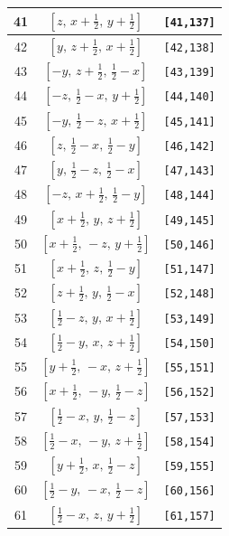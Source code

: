 \documentclass[fleqn,8pt]{jsarticle}
\begin{document}
\begin{longtable}{ccc}
41 & $\left[ z,\, x + \frac{1}{2},\, y + \frac{1}{2} \right]$ & {\tt [41,137]} \\ \hline
42 & $\left[ y,\, z + \frac{1}{2},\, x + \frac{1}{2} \right]$ & {\tt [42,138]} \\ \hline
43 & $\left[ - y,\, z + \frac{1}{2},\, \frac{1}{2} - x \right]$ & {\tt [43,139]} \\ \hline
44 & $\left[ - z,\, \frac{1}{2} - x,\, y + \frac{1}{2} \right]$ & {\tt [44,140]} \\ \hline
45 & $\left[ - y,\, \frac{1}{2} - z,\, x + \frac{1}{2} \right]$ & {\tt [45,141]} \\ \hline
46 & $\left[ z,\, \frac{1}{2} - x,\, \frac{1}{2} - y \right]$ & {\tt [46,142]} \\ \hline
47 & $\left[ y,\, \frac{1}{2} - z,\, \frac{1}{2} - x \right]$ & {\tt [47,143]} \\ \hline
48 & $\left[ - z,\, x + \frac{1}{2},\, \frac{1}{2} - y \right]$ & {\tt [48,144]} \\ \hline
49 & $\left[ x + \frac{1}{2},\, y,\, z + \frac{1}{2} \right]$ & {\tt [49,145]} \\ \hline
50 & $\left[ x + \frac{1}{2},\, - z,\, y + \frac{1}{2} \right]$ & {\tt [50,146]} \\ \hline
51 & $\left[ x + \frac{1}{2},\, z,\, \frac{1}{2} - y \right]$ & {\tt [51,147]} \\ \hline
52 & $\left[ z + \frac{1}{2},\, y,\, \frac{1}{2} - x \right]$ & {\tt [52,148]} \\ \hline
53 & $\left[ \frac{1}{2} - z,\, y,\, x + \frac{1}{2} \right]$ & {\tt [53,149]} \\ \hline
54 & $\left[ \frac{1}{2} - y,\, x,\, z + \frac{1}{2} \right]$ & {\tt [54,150]} \\ \hline
55 & $\left[ y + \frac{1}{2},\, - x,\, z + \frac{1}{2} \right]$ & {\tt [55,151]} \\ \hline
56 & $\left[ x + \frac{1}{2},\, - y,\, \frac{1}{2} - z \right]$ & {\tt [56,152]} \\ \hline
57 & $\left[ \frac{1}{2} - x,\, y,\, \frac{1}{2} - z \right]$ & {\tt [57,153]} \\ \hline
58 & $\left[ \frac{1}{2} - x,\, - y,\, z + \frac{1}{2} \right]$ & {\tt [58,154]} \\ \hline
59 & $\left[ y + \frac{1}{2},\, x,\, \frac{1}{2} - z \right]$ & {\tt [59,155]} \\ \hline
60 & $\left[ \frac{1}{2} - y,\, - x,\, \frac{1}{2} - z \right]$ & {\tt [60,156]} \\ \hline
61 & $\left[ \frac{1}{2} - x,\, z,\, y + \frac{1}{2} \right]$ & {\tt [61,157]} \\ \hline

\end{longtable}
\end{document}

